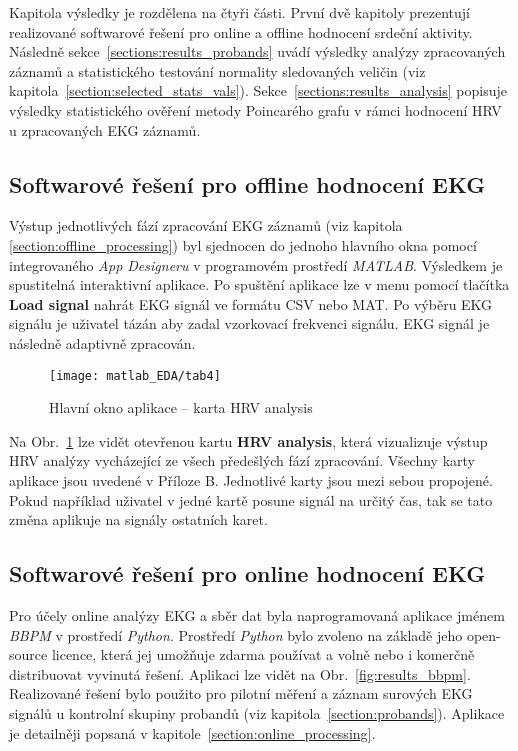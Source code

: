 Kapitola výsledky je rozdělena na čtyři části. První dvě kapitoly prezentují
realizované softwarové řešení pro online a offline hodnocení srdeční aktivity.
Následně sekce~\ref{sections:results_probands} uvádí výsledky analýzy
zpracovaných záznamů a statistického testování normality sledovaných veličin
(viz kapitola~\ref{section:selected_stats_vals}).
Sekce~\ref{sections:results_analysis} popisuje výsledky statistického ověření
metody Poincarého grafu v rámci hodnocení HRV u zpracovaných EKG záznamů.

\subsection{Softwarové řešení pro offline hodnocení EKG}
\label{sections:results_online}
Výstup jednotlivých fází zpracování EKG záznamů (viz kapitola
\ref{section:offline_processing}) byl sjednocen do jednoho hlavního okna pomocí
integrovaného \textit{App Designeru} \cite{matlabAPPDESIGNER} v programovém
prostředí \textit{MATLAB}. Výsledkem je spustitelná interaktivní aplikace. Po
spuštění aplikace lze v menu pomocí tlačítka \textbf{Load signal} nahrát EKG
signál ve formátu CSV nebo MAT. Po výběru EKG signálu je uživatel tázán aby
zadal vzorkovací frekvenci signálu. EKG signál je následně adaptivně zpracován.
\begin{figure}[h]
	\begin{center}
		\texttt{[image: matlab\_EDA/tab4]}
		\caption{Hlavní okno aplikace -- karta HRV analysis}
		\label{fig:results_matlab_tab4}
	\end{center}
\end{figure}
Na Obr.~\ref{fig:results_matlab_tab4} lze vidět otevřenou kartu \textbf{HRV
analysis}, která vizualizuje výstup HRV analýzy vycházející ze všech předešlých
fází zpracování. Všechny karty aplikace jsou uvedené v Příloze B. Jednotlivé
karty jsou mezi sebou propojené. Pokud například uživatel v jedné kartě posune
signál na určitý čas, tak se tato změna aplikuje na signály ostatních karet.

\subsection{Softwarové řešení pro online hodnocení EKG}
\label{sections:result_offline}
Pro účely online analýzy EKG a sběr dat byla naprogramovaná aplikace jménem
\textit{BBPM} v prostředí \textit{Python}. Prostředí \textit{Python} bylo
zvoleno na základě jeho open-source licence, která jej umožňuje zdarma používat
a volně nebo i komerčně distribuovat vyvinutá řešení. Aplikaci lze vidět na
Obr.~\ref{fig:results_bbpm}. Realizované řešení bylo použito pro pilotní měření
a záznam surových EKG signálů u kontrolní skupiny probandů (viz
kapitola~\ref{section:probands}). Aplikace je detailněji popsaná v
kapitole~\ref{section:online_processing}.

